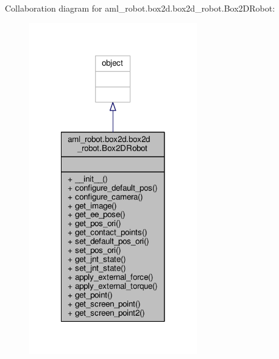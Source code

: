 Collaboration diagram for aml\-\_\-robot.\-box2d.\-box2d\-\_\-robot.\-Box2\-D\-Robot\-:\nopagebreak
\begin{figure}[H]
\begin{center}
\leavevmode
\includegraphics[width=206pt]{classaml__robot_1_1box2d_1_1box2d__robot_1_1_box2_d_robot__coll__graph}
\end{center}
\end{figure}
